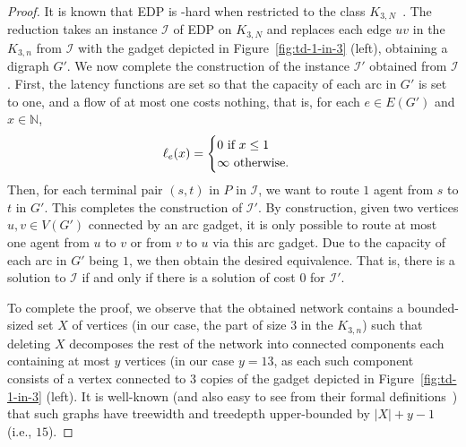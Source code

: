 \documentclass[letterpaper]{article} %
\begin{document}
\begin{proof}
It is known that \textsc{EDP} is \NP-hard when restricted to the class $K_{3,N}$~\cite{FleszarMS18}.
The reduction takes an instance $\mathcal{I}$ of \textsc{EDP} on $K_{3,N}$ and replaces each edge $uv$ in the $K_{3,n}$ from $\mathcal{I}$ with the gadget depicted in Figure~\ref{fig:td-1-in-3} (left), obtaining a digraph $G'$.
We now complete the construction of the instance $\mathcal{I}'$ obtained from $\mathcal{I}$. First, the latency functions are set so that the capacity of each arc in $G'$ is set to one, and a flow of at most one costs nothing, that is, for each $e\in E(G')$ and $x\in \mathbb{N}$,
\[
\ell_e(x) =
\begin{cases}
0 $ if $ x \leq 1 \\
\infty $ otherwise$.
\end{cases}
\]
Then, for each terminal pair $(s,t)$ in $P$ in $\mathcal{I}$, we want to route $1$ agent from $s$ to $t$ in $G'$.
This completes the construction of $\mathcal{I}'$.
By construction, given two vertices $u,v\in V(G')$ connected by an arc gadget, it is only possible to route at most one agent from $u$ to $v$ or from $v$ to $u$ via this arc gadget.
Due to the capacity of each arc in $G'$ being $1$, we then obtain the desired equivalence.
That is, there is a solution to $\mathcal{I}$ if and only if there is a solution of cost $0$ for $\mathcal{I}'$.

To complete the proof, we observe that the obtained network contains a bounded-sized set $X$ of vertices (in our case, the part of size $3$ in the $K_{3,n}$) such that deleting $X$ decomposes the rest of the network into connected components each containing at most $y$ vertices (in our case $y=13$, as each such component consists of a vertex connected to $3$ copies of the gadget depicted in Figure~\ref{fig:td-1-in-3} (left). It is well-known (and also easy to see from their formal definitions~\cite{RobertsonS86,sparsity,CyganFKLMPPS15}) that such graphs have treewidth and treedepth upper-bounded by $|X|+y-1$ (i.e., $15$).
\end{proof}
\end{document}
